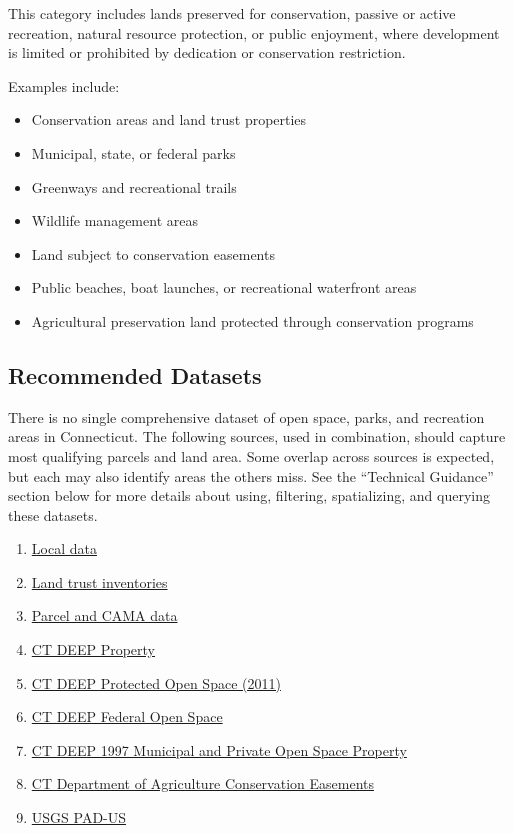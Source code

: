 \documentclass[
  letterpaper,
  DIV=11,
  numbers=noendperiod]{scrreprt}
\providecommand{\tightlist}{%
  \setlength{\itemsep}{0pt}\setlength{\parskip}{0pt}}
\begin{document}
This category includes lands preserved for conservation, passive or
active recreation, natural resource protection, or public enjoyment,
where development is limited or prohibited by dedication or conservation
restriction.

Examples include:

\begin{itemize}
\tightlist
\item
  Conservation areas and land trust properties
\item
  Municipal, state, or federal parks
\item
  Greenways and recreational trails
\item
  Wildlife management areas
\item
  Land subject to conservation easements
\item
  Public beaches, boat launches, or recreational waterfront areas
\item
  Agricultural preservation land protected through conservation programs
\end{itemize}

\subsection{Recommended Datasets}\label{recommended-datasets-1}

There is no single comprehensive dataset of open space, parks, and
recreation areas in Connecticut. The following sources, used in
combination, should capture most qualifying parcels and land area. Some
overlap across sources is expected, but each may also identify areas the
others miss. See the ``Technical Guidance'' section below for more
details about using, filtering, spatializing, and querying these
datasets.

\begin{enumerate}
\def\labelenumi{\arabic{enumi}.}
\tightlist
\item
  \hyperref[sec-local-data2]{Local data}
\item
  \hyperref[sec-land-trust-inventories]{Land trust inventories}
\item
  \hyperref[sec-parcel-and-cama-data2]{Parcel and CAMA data}
\item
  \hyperref[sec-ct-deep-property]{CT DEEP Property}
\item
  \hyperref[sec-ct-deep-protected-open-space-2011]{CT DEEP Protected
  Open Space (2011)}
\item
  \hyperref[sec-ct-deep-federal-open-space]{CT DEEP Federal Open Space}
\item
  \hyperref[sec-ct-deep-1997-municipal-and-private-open-space-property]{CT
  DEEP 1997 Municipal and Private Open Space Property}
\item
  \hyperref[sec-ct-department-of-agriculture-conservation-easements]{CT
  Department of Agriculture Conservation Easements}
\item
  \hyperref[sec-usgs-protected-areas-database-of-the-united-states]{USGS
  PAD-US}
\end{enumerate}
\end{document}
